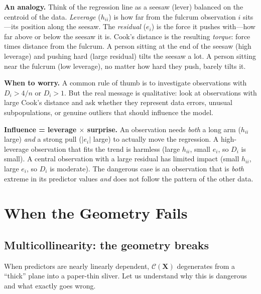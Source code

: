\documentclass[11pt,a4paper]{article}
\theoremstyle{plain}
\theoremstyle{definition}
\newcommand{\bX}{\bm{X}}
\newcommand{\Col}{\mathcal{C}}
\begin{document}
\medskip
\noindent\textbf{An analogy.}
Think of the regression line as a seesaw (lever) balanced on the centroid of the data.
\emph{Leverage} ($h_{ii}$) is how far from the fulcrum observation $i$ sits---its position along the seesaw.
The \emph{residual} ($e_i$) is the force it pushes with---how far above or below the seesaw it is.
Cook's distance is the resulting \emph{torque}: force times distance from the fulcrum.
A person sitting at the end of the seesaw (high leverage) and pushing hard (large residual) tilts the seesaw a lot. A person sitting near the fulcrum (low leverage), no matter how hard they push, barely tilts it.

\medskip
\noindent\textbf{When to worry.}
A common rule of thumb is to investigate observations with $D_i > 4/n$ or $D_i > 1$.
But the real message is qualitative: look at observations with large Cook's distance
and ask whether they represent data errors, unusual subpopulations, or genuine outliers
that should influence the model.

\begin{keyinsight}
\textbf{Influence = leverage $\times$ surprise.}
An observation needs \emph{both} a long arm ($h_{ii}$ large) \emph{and}
a strong pull ($|e_i|$ large) to actually move the regression.
A high-leverage observation that fits the trend is harmless
(large $h_{ii}$, small $e_i$, so $D_i$ is small).
A central observation with a large residual has limited impact
(small $h_{ii}$, large $e_i$, so $D_i$ is moderate).
The dangerous case is an observation that is \emph{both} extreme in its
predictor values \emph{and} does not follow the pattern of the other data.
\end{keyinsight}


\section{When the Geometry Fails}\label{sec:failures}

\subsection{Multicollinearity: the geometry breaks}\label{sec:multicollinearity}

When predictors are nearly linearly dependent, $\Col(\bX)$ degenerates
from a ``thick'' plane into a paper-thin sliver.
Let us understand why this is dangerous and what exactly goes wrong.
\end{document}
